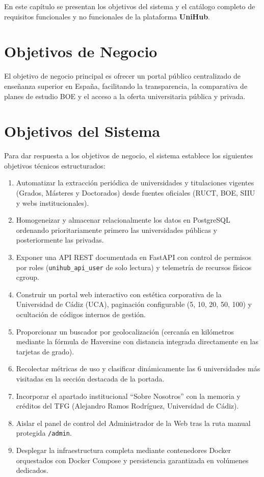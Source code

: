 En este capítulo se presentan los objetivos del sistema y el catálogo completo de requisitos funcionales y no funcionales de la plataforma \textbf{UniHub}.

\section{Objetivos de Negocio}
El objetivo de negocio principal es ofrecer un portal público centralizado de enseñanza superior en España, facilitando la transparencia, la comparativa de planes de estudio BOE y el acceso a la oferta universitaria pública y privada.

\section{Objetivos del Sistema}
Para dar respuesta a los objetivos de negocio, el sistema establece los siguientes objetivos técnicos estructurados:
\begin{enumerate}
    \item Automatizar la extracción periódica de universidades y titulaciones vigentes (Grados, Másteres y Doctorados) desde fuentes oficiales (RUCT, BOE, SIIU y webs institucionales).
    \item Homogeneizar y almacenar relacionalmente los datos en PostgreSQL ordenando prioritariamente primero las universidades públicas y posteriormente las privadas.
    \item Exponer una API REST documentada en FastAPI con control de permisos por roles (\texttt{unihub\_api\_user} de solo lectura) y telemetría de recursos físicos cgroup.
    \item Construir un portal web interactivo con estética corporativa de la Universidad de Cádiz (UCA), paginación configurable (5, 10, 20, 50, 100) y ocultación de códigos internos de gestión.
    \item Proporcionar un buscador por geolocalización (cercanía en kilómetros mediante la fórmula de Haversine con distancia integrada directamente en las tarjetas de grado).
    \item Recolectar métricas de uso y clasificar dinámicamente las 6 universidades más visitadas en la sección destacada de la portada.
    \item Incorporar el apartado institucional ``Sobre Nosotros'' con la memoria y créditos del TFG (Alejandro Ramos Rodríguez, Universidad de Cádiz).
    \item Aislar el panel de control del Administrador de la Web tras la ruta manual protegida \texttt{/admin}.
    \item Desplegar la infraestructura completa mediante contenedores Docker orquestados con Docker Compose y persistencia garantizada en volúmenes dedicados.
\end{enumerate}

